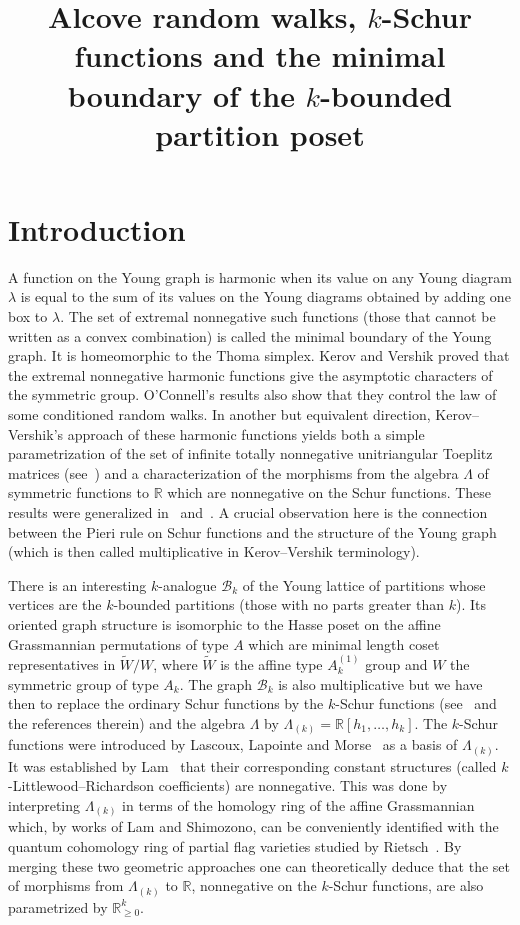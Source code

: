\documentclass[ALCO,ThmDefs,Unicode,epreuves]{cedram}
\author{\firstname{C{\'e}dric} \lastname{Lecouvey}}
\author{\firstname{Pierre} \lastname{Tarrago}}
\title
[Alcove walks and $k$-Schur functions]
{Alcove random walks, $k$-Schur functions and the minimal boundary of the
$k$-bounded partition poset}
\begin{document}
\maketitle

\section{Introduction}\label{section1}

A function on the Young graph is harmonic when its value on any Young diagram
$\lambda$ is equal to the sum of its values on the Young diagrams obtained by
adding one box to $\lambda$. The set of extremal nonnegative such functions
(\ie those that cannot be written as a convex combination) is called the
minimal boundary of the Young graph. It is homeomorphic to the Thoma simplex.
Kerov and Vershik proved that the extremal nonnegative harmonic functions give
the asymptotic characters of the symmetric group. O'Connell's results
\cite{OC1} also show that they control the law of some conditioned random
walks. In another but equivalent direction, Kerov--Vershik's approach of these
harmonic functions yields both a simple parametrization of the set of infinite
totally nonnegative unitriangular Toeplitz matrices (see~\cite{Ker}) and a
characterization of the morphisms from the algebra $\Lambda$ of symmetric
functions to $\mathbb{R}$ which are nonnegative on the Schur functions. These
results were generalized in~\cite{LLP2} and~\cite{LT}. A crucial observation
here is the connection between the Pieri rule on Schur functions and the
structure of the Young graph (which is then called multiplicative in
Kerov--Vershik terminology).

There is an interesting
$k$-analogue $\mathcal{B}_{k}$ of the Young lattice of partitions whose
vertices are the $k$-bounded partitions (\ie those with no parts greater than
$k$). Its oriented graph structure is isomorphic to the Hasse poset on the
affine Grassmannian permutations of type $A$ which are minimal length coset
representatives in $\widetilde{W}/W$, where $\widetilde{W}$ is the affine type
$A_{k}^{(1)}$ group and $W$ the symmetric group of type $A_{k}$. The graph
$\mathcal{B}_{k}$ is also multiplicative but we have then to replace the
ordinary Schur functions by the $k$-Schur functions (see~\cite{LLMSSZ} and the
references therein) and the algebra $\Lambda$ by $\Lambda_{(k)}=\mathbb{R}%
[h_{1},\ldots,h_{k}]$. The $k$-Schur functions were introduced by Lascoux,
Lapointe and Morse~\cite{LLM} as a basis of $\Lambda_{(k)}$. It was
established by Lam~\cite{LamLR} that their corresponding constant structures
(called $k$-Littlewood--Richardson coefficients) are nonnegative. This was
done by interpreting $\Lambda_{(k)}$ in terms of the homology ring of the
affine Grassmannian which, by works of Lam and Shimozono, can be conveniently
identified with the quantum cohomology ring of partial flag varieties studied
by Rietsch~\cite{Ri}. By merging these two geometric approaches one can theoretically
deduce that the set of morphisms from $\Lambda_{(k)}$ to $\mathbb{R}$,
nonnegative on the $k$-Schur functions, are also parametrized by
$\mathbb{R}_{\geq0}^{k}$.
\end{document}
